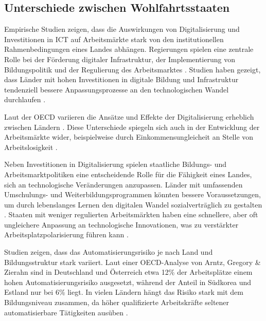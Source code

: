 
\subsection{Unterschiede zwischen Wohlfahrtsstaaten}

Empirische Studien zeigen, dass die Auswirkungen von Digitalisierung und Investitionen in 
\ac{ICT} auf Arbeitsmärkte stark von den institutionellen Rahmenbedingungen eines Landes 
abhängen. Regierungen spielen eine zentrale Rolle bei der Förderung digitaler Infrastruktur, der 
Implementierung von Bildungspolitik und der Regulierung des Arbeitsmarktes 
\parencite[vgl.][S. 4–5]{hall2001varieties}. Studien haben gezeigt, dass Länder mit hohen 
Investitionen in digitale Bildung und Infrastruktur tendenziell bessere Anpassungsprozesse an den 
technologischen Wandel durchlaufen \parencite[vgl.][S. 109–111]{oecd2020digital}.

Laut der \ac{OECD} variieren die Ansätze und Effekte der Digitalisierung erheblich zwischen 
Ländern \parencite[vgl.][S. 36–37]{oecd2020digital}. Diese Unterschiede spiegeln sich auch in der 
Entwicklung der Arbeitsmärkte wider, beispielweise durch Einkommensungleicheit an Stelle von  
Arbeitslosigkeit \parencite[vgl.][S. 71]{nickell1997unemployment}.

Neben Investitionen in Digitalisierung spielen staatliche Bildungs- und Arbeitsmarktpolitiken 
eine entscheidende Rolle für die Fähigkeit eines Landes, sich an technologische Veränderungen 
anzupassen. Länder mit umfassenden Umschulungs- und Weiterbildungsprogrammen könnten bessere 
Voraussetzungen, um durch lebenslanges Lernen den digitalen Wandel sozialverträglich zu gestalten 
\parencite[vgl.][S. 370–371]{vu2011ict}. 
Staaten mit weniger regulierten Arbeitsmärkten haben eine schnellere, aber oft ungleichere 
Anpassung an technologische Innovationen, was zu verstärkter Arbeitsplatzpolarisierung führen 
kann \parencite[vgl.][S. 27–28]{hall2001varieties}.

Studien zeigen, dass das Automatisierungsrisiko je nach Land und Bildungsstruktur stark 
variiert. Laut einer OECD-Analyse von Arntz, Gregory \& Zierahn sind in Deutschland und 
Österreich etwa 12\% der Arbeitsplätze einem hohen Automatisierungsrisiko ausgesetzt, 
während der Anteil in Südkorea und Estland nur bei 6\% liegt. In vielen Ländern hängt 
das Risiko stark mit dem Bildungsniveau zusammen, da höher qualifizierte Arbeitskräfte 
seltener automatisierbare Tätigkeiten ausüben \parencite[vgl.][S. 15–16]{arntz2016therisk}. 

